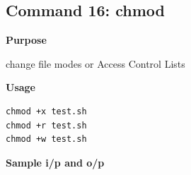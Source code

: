 \subsection{Command 16: chmod} 
\textbf{Purpose}
\begin{flushleft}
 change file modes or Access Control Lists
\end{flushleft}
\textbf{Usage}
\begin{verbatim}
chmod +x test.sh
chmod +r test.sh
chmod +w test.sh
\end{verbatim}
\textbf{Sample i/p and o/p}
\begin{figure}[H] 
\end{figure}
